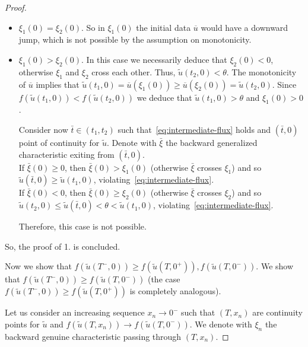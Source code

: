 \documentclass[a4paper, 10pt, final]{article}
\begin{document}
\begin{proof}
\begin{itemize}
      Therefore, this case is not possible.
    
    \item[(ii)] $\xi_1(0) = \xi_2(0)$. So in  $\xi_1(0)$ the initial data $\overline u$ would have a downward jump, 
    which is not possible by the assumption on monotonicity. 

    \item[(iii)] $\xi_1(0) > \xi_2(0)$. In this case we necessarily deduce that $\xi_2(0) < 0$, otherwise
      $\xi_1$ and $\xi_2$ cross each other. Thus, $\widetilde{u}(t_2, 0) < \theta$.
      The monotonicity of $\overline u$ implies that
      $\widetilde{u}(t_1, 0) = \overline u(\xi_1(0)) \ge \overline u(\xi_2(0)) = \widetilde{u}(t_2, 0)$.
      Since $f(\widetilde{u}(t_1, 0)) < f(\widetilde{u}(t_2, 0))$ we deduce that
      $\widetilde{u}(t_1, 0) > \theta$ and $\xi_1(0) > 0$.

      Consider now $\bar t \in (t_1, t_2)$ such that~\eqref{eq:intermediate-flux} holds 
      and $(\bar t, 0)$ point of continuity for $\widetilde{u}$.
      Denote with $\bar \xi$ the backward generalized characteristic exiting from $(\bar t, 0)$.\\
      If $\bar \xi(0) \ge 0$, then $\bar \xi(0) > \xi_1(0)$ (otherwise $\bar \xi$ crosses $\xi_1$)
      and so $\widetilde{u}(\bar t, 0) \ge \widetilde{u}(t_1, 0)$, 
      violating~\eqref{eq:intermediate-flux}.\\
      If $\bar \xi(0) < 0$, then $\bar \xi(0) \ge \xi_2(0)$ (otherwise $\bar \xi$ crosses $\xi_2$)
      and so $\widetilde{u}(t_2, 0) \le \widetilde{u}(\bar t, 0) < \theta <  \widetilde{u}(t_1, 0)$, 
      violating~\eqref{eq:intermediate-flux}.

      Therefore, this case is not possible. 
  \end{itemize}
So, the proof of 1. is concluded.
\smallskip

Now we show that $f(\widetilde{u}(T^-, 0))\geq f(\widetilde{u}(T, 0^+)), f(\widetilde{u}(T, 0^-))$. We show that 
$f(\widetilde{u}(T^-, 0))\geq  f(\widetilde{u}(T, 0^-))$ (the case $f(\widetilde{u}(T^-, 0))\geq f(\widetilde{u}(T, 0^+))$ 
is completely analogous). 

Let us consider an increasing  sequence $x_n\to 0^-$   such that $(T,x_n)$  are continuity points for $\widetilde u$ 
and $f(\widetilde{u}(T, x_n))\to f(\widetilde{u}(T, 0^-))$. We denote with $\xi_n$ the backward genuine characteristic 
passing through $(T,x_n)$. 


\end{proof}
\end{document}
